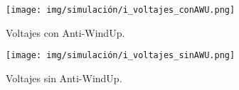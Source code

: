 \begin{figure}[H]
    \centering
    \texttt{[image: img/simulación/i\_voltajes\_conAWU.png]}
    \caption{Voltajes con Anti-WindUp.}
    \label{fig:i_voltajes_conAWU}
\end{figure}

\begin{figure}[H]
    \centering
    \texttt{[image: img/simulación/i\_voltajes\_sinAWU.png]}
    \caption{Voltajes sin Anti-WindUp.}
    \label{fig:i_voltajes_sinAWU}
\end{figure}

\newpage
